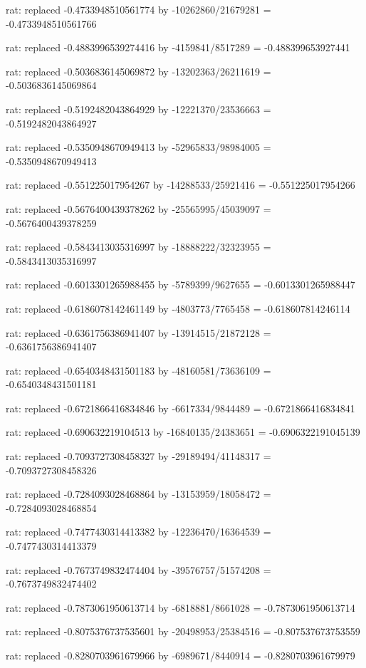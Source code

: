 \documentclass[a4paper,10pt]{article}
\begin{document}
\begin{eulernotebook}
\begin{eulercomment}
\begin{eulercomment}
\begin{eulercomment}
\begin{eulercomment}
\begin{eulercomment}
\begin{eulercomment}
\begin{eulercomment}
\begin{eulercomment}
\begin{eulercomment}
\begin{eulercomment}
\begin{eulercomment}
\begin{eulercomment}
\begin{eulercomment}
\begin{eulercomment}
\begin{eulercomment}
\begin{eulercomment}
\begin{euleroutput}
  rat: replaced -0.4733948510561774 by -10262860/21679281 = -0.4733948510561766
  
  rat: replaced -0.4883996539274416 by -4159841/8517289 = -0.488399653927441
  
  rat: replaced -0.5036836145069872 by -13202363/26211619 = -0.5036836145069864
  
  rat: replaced -0.5192482043864929 by -12221370/23536663 = -0.5192482043864927
  
  rat: replaced -0.5350948670949413 by -52965833/98984005 = -0.5350948670949413
  
  rat: replaced -0.551225017954267 by -14288533/25921416 = -0.551225017954266
  
  rat: replaced -0.5676400439378262 by -25565995/45039097 = -0.5676400439378259
  
  rat: replaced -0.5843413035316997 by -18888222/32323955 = -0.5843413035316997
  
  rat: replaced -0.6013301265988455 by -5789399/9627655 = -0.6013301265988447
  
  rat: replaced -0.6186078142461149 by -4803773/7765458 = -0.618607814246114
  
  rat: replaced -0.6361756386941407 by -13914515/21872128 = -0.6361756386941407
  
  rat: replaced -0.6540348431501183 by -48160581/73636109 = -0.6540348431501181
  
  rat: replaced -0.6721866416834846 by -6617334/9844489 = -0.6721866416834841
  
  rat: replaced -0.690632219104513 by -16840135/24383651 = -0.6906322191045139
  
  rat: replaced -0.7093727308458327 by -29189494/41148317 = -0.7093727308458326
  
  rat: replaced -0.7284093028468864 by -13153959/18058472 = -0.7284093028468854
  
  rat: replaced -0.7477430314413382 by -12236470/16364539 = -0.7477430314413379
  
  rat: replaced -0.7673749832474404 by -39576757/51574208 = -0.7673749832474402
  
  rat: replaced -0.7873061950613714 by -6818881/8661028 = -0.7873061950613714
  
  rat: replaced -0.8075376737535601 by -20498953/25384516 = -0.807537673753559
  
  rat: replaced -0.8280703961679966 by -6989671/8440914 = -0.8280703961679979
  

\end{euleroutput}
\end{eulercomment}
\end{eulercomment}
\end{eulercomment}
\end{eulercomment}
\end{eulercomment}
\end{eulercomment}
\end{eulercomment}
\end{eulercomment}
\end{eulercomment}
\end{eulercomment}
\end{eulercomment}
\end{eulercomment}
\end{eulercomment}
\end{eulercomment}
\end{eulercomment}
\end{eulercomment}
\end{eulernotebook}
\end{document}
